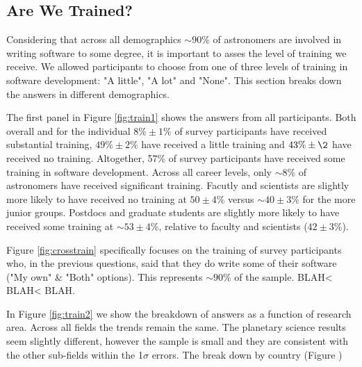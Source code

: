 \subsection{Are We Trained?}

Considering that across all demographics $\sim90\%$ of astronomers are involved in writing software to some degree, it is important to asses the level of training we receive. We allowed participants to choose from one of three levels of training in software development: "A little", "A lot" and "None". This section breaks down the answers in different demographics. 

The first panel in Figure \ref{fig:train1} shows the answers from all participants. Both overall and for the individual  $8\%\pm1\%$ of survey participants have received substantial training, $49\%\pm2\%$ have received a little training and $43\%\pm\2$ have received no training. Altogether, 57\% of survey participants have received some training in software development. Across all career levels, only $\sim8\%$ of astronomers have received significant training. Facutly and scientists are slightly more likely to have received no training at $50\pm4\%$ versus $\sim40\pm3\%$ for the more junior groups. Postdocs and graduate students are slightly more likely to have received some training at $\sim53\pm4\%$, relative to faculty and scientists ($42\pm3\%$).

Figure \ref{fig:crosstrain} specifically focuses on the training of survey participants who, in the previous questions, said that they do write some of their software ("My own" & "Both" options). This represents $\sim90\%$ of the sample. BLAH< BLAH< BLAH.

In Figure \ref{fig:train2} we show the breakdown of answers as a function of research area. Across all fields the trends remain the same. The planetary science results seem slightly different, however the sample is small and they are consistent with the other sub-fields within the 1$\sigma$ errors. The break down by country (Figure )

